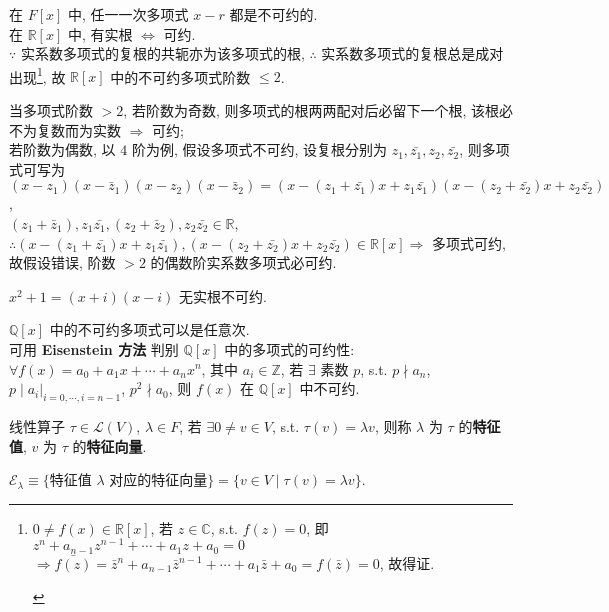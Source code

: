 \documentclass{note}
\begin{document}
在 $F[x]$ 中, 任一一次多项式 $x-r$ 都是不可约的.\\
在 $\mathbb{R}[x]$ 中, 有实根 $\Longleftrightarrow$ 可约.\\
$\because$ 实系数多项式的复根的共轭亦为该多项式的根, $\therefore$ 实系数多项式的复根总是成对出现\footnote{\begin{pf}
    $0\neq f(x)\in\mathbb{R}[x]$, 若 $z\in\mathbb{C}$, s.t. $f(z)=0$, 即 $z^n+a_{n-1}z^{n-1}+\cdots+a_1z+a_0=0$\\
    $\Longrightarrow\bar{f(z)}=\bar{z}^n+a_{n-1}\bar{z}^{n-1}+\cdots+a_1\bar{z}+a_0=f(\bar{z})=0$, 故得证.
\end{pf}}, 故 $\mathbb{R}[x]$ 中的不可约多项式阶数 $\leq 2$.
\begin{pf}
    当多项式阶数 $>2$, 若阶数为奇数, 则多项式的根两两配对后必留下一个根, 该根必不为复数而为实数 $\Longrightarrow$ 可约;\\
若阶数为偶数, 以 $4$ 阶为例, 假设多项式不可约, 设复根分别为 $z_1,\bar{z_1},z_2,\bar{z_2}$, 则多项式可写为 $(x-z_1)(x-\bar{z}_1)(x-z_2)(x-\bar{z}_2)=(x-(z_1+\bar{z_1})x+z_1\bar{z_1})(x-(z_2+\bar{z_2})x+z_2\bar{z_2})$,\\
$(z_1+\bar{z}_1),z_1\bar{z_1},(z_2+\bar{z}_2),z_2\bar{z_2}\in\mathbb{R}$, $\therefore (x-(z_1+\bar{z_1})x+z_1\bar{z_1}),(x-(z_2+\bar{z_2})x+z_2\bar{z_2})\in\mathbb{R}[x]\Longrightarrow$ 多项式可约, 故假设错误, 阶数 $>2$ 的偶数阶实系数多项式必可约.
\end{pf}
\begin{eg}
    $x^2+1=(x+i)(x-i)$ 无实根不可约.
\end{eg}
$\mathbb{Q}[x]$ 中的不可约多项式可以是任意次.\\
可用 \textbf{Eisenstein 方法} 判别 $\mathbb{Q}[x]$ 中的多项式的可约性: $\forall f(x)=a_0+a_1x+\cdots+a_nx^n$, 其中 $a_i\in\mathbb{Z}$, 若 $\exists$ 素数 $p$, s.t. $p\nmid a_n$, $p\mid a_i\vert_{i=0,\cdots,i=n-1}$, $p^2\nmid a_0$, 则 $f(x)$ 在 $\mathbb{Q}[x]$ 中不可约.

\begin{df}[特征值和特征向量]
    线性算子 $\tau\in\mathcal{L}(V)$, $\lambda\in F$, 若 $\exists 0\neq v\in V$, s.t. $\tau(v)=\lambda v$, 则称 $\lambda$ 为 $\tau$ 的\textbf{特征值}, $v$ 为 $\tau$ 的\textbf{特征向量}.
\end{df}

\begin{df}
    $\mathcal{E}_{\lambda}\equiv\{\text{特征值 $\lambda$ 对应的特征向量}\}=\{v\in V\mid\tau(v)=\lambda v\}$.
\end{df}
\end{document}
